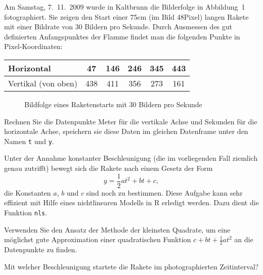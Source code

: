 Am Samstag, 7.~11.~2009 wurde in Kaltbrunn die
Bilderfolge in Abbildung~1 fotographiert. Sie zeigen den Start
einer 75cm (im Bild 48Pixel) langen Rakete mit einer Bildrate von
30 Bildern pro Sekunde.
Durch Ausmessen des gut definierten Anfangspunktes der Flamme findet
man die folgenden Punkte in Pixel-Koordinaten:
\begin{center}
\begin{tabular}{l|ccccc}
Horizontal&47&146&246&345&443\\
\hline
Vertikal (von oben)&438&411&356&273&161
\end{tabular}
\end{center}
\begin{figure}
\begin{center}
\end{center}
\caption{Bildfolge eines Raketenstarts mit 30 Bildern pro Sekunde}
\end{figure}
\begin{teilaufgaben}
\item Rechnen Sie die Datenpunkte Meter für die vertikale Achse
und Sekunden für die horizontale Achse, speichern sie diese Daten
im gleichen Datenframe unter den Namen {\tt t} und {\tt y}.
\item Unter der Annahme konstanter Beschleunigung (die im vorliegenden Fall
ziemlich genau zutrifft) bewegt sich die Rakete nach einem Gesetz
der Form
\[
y=\frac12at^2+bt+c,
\]
die Konstanten $a$, $b$ und $c$ sind noch zu bestimmen. Diese Aufgabe
kann sehr effizient mit Hilfe eines nichtlinearen Modells in R erledigt
werden. Dazu dient die Funktion {\tt nls}.
\item Verwenden Sie den Ansatz der Methode der kleinsten Quadrate, um
eine möglichst gute Approximation einer quadratischen Funktion
$c+bt+\frac12at^2$ an die Datenpunkte zu finden.
\item Mit welcher Beschleunigung startete die Rakete im photographierten
Zeitinterval?
\end{teilaufgaben}


